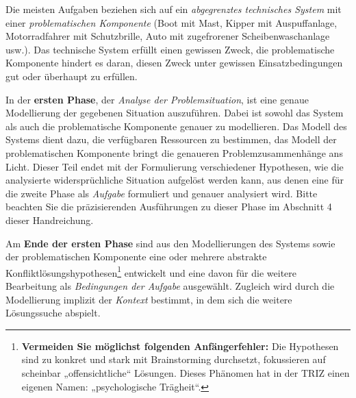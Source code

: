 \documentclass[11pt,a4paper]{article}
\begin{document}
Die meisten Aufgaben beziehen sich auf ein \emph{abgegrenztes technisches
  System} mit einer \emph{problematischen Komponente} (Boot mit Mast, Kipper
mit Auspuffanlage, Motorradfahrer mit Schutzbrille, Auto mit zugefrorener
Scheibenwaschanlage usw.). Das technische System erfüllt einen gewissen Zweck,
die problematische Komponente hindert es daran, diesen Zweck unter gewissen
Einsatzbedingungen gut oder überhaupt zu erfüllen.

In der \textbf{ersten Phase}, der \emph{Analyse der Problemsituation}, ist
eine genaue Modellierung der gegebenen Situation auszuführen. Dabei ist sowohl
das System als auch die problematische Komponente genauer zu modellieren.  Das
Modell des Systems dient dazu, die verfügbaren Ressourcen zu bestimmen, das
Modell der problematischen Komponente bringt die genaueren
Problemzusammenhänge ans Licht.  Dieser Teil endet mit der Formulierung
verschiedener Hypothesen, wie die analysierte widersprüchliche Situation
aufgelöst werden kann, aus denen eine für die zweite Phase als \emph{Aufgabe}
formuliert und genauer analysiert wird.  Bitte beachten Sie die präzisierenden
Ausführungen zu dieser Phase im Abschnitt 4 dieser Handreichung.

Am \textbf{Ende der ersten Phase} sind aus den Modellierungen des Systems
sowie der problematischen Komponente eine oder mehrere abstrakte
Konfliktlösungshypothesen\footnote{\textbf{Vermeiden Sie möglichst folgenden
    Anfängerfehler:} Die Hypothesen sind zu konkret und stark mit
  Brainstorming durchsetzt, fokussieren auf scheinbar „offensichtliche“
  Lösungen. Dieses Phänomen hat in der TRIZ einen eigenen Namen:
  „psychologische Trägheit“.} entwickelt und eine davon für die weitere
Bearbeitung als \emph{Bedingungen der Aufgabe} ausgewählt. Zugleich wird durch
die Modellierung implizit der \emph{Kontext} bestimmt, in dem sich die weitere
Lösungssuche abspielt.
\end{document}
